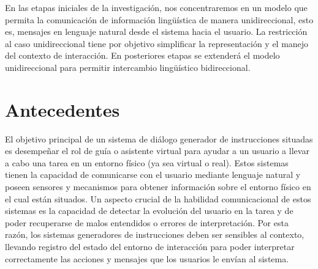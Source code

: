 \documentclass[10.9pt,a4paper]{article}
\begin{document}
En las etapas iniciales de la investigaci\'on, nos concentraremos en un 
modelo que permita la comunicaci\'on de informaci\'on ling\"u\'istica de 
manera unidireccional, esto es, mensajes en lenguaje natural desde el 
sistema hacia el usuario. La restricci\'on al caso unidireccional tiene por 
objetivo simplificar la representaci\'on y el manejo del contexto de
interacci\'on. En posteriores etapas se extender\'a el modelo unidireccional 
para permitir intercambio ling\"u\'istico bidireccional.




\section{Antecedentes}

El objetivo principal de un sistema de di\'alogo generador de instrucciones 
situadas es desempe\~nar el rol de gu\'ia o asistente virtual para ayudar a 
un usuario a llevar a cabo una tarea en un entorno f\'isico (ya sea virtual o 
real). Estos sistemas tienen la capacidad de comunicarse con el 
usuario mediante lenguaje natural y poseen sensores y mecanismos para 
obtener informaci\'on sobre el entorno f\'isico en el cual est\'an situados. 
Un aspecto crucial de la habilidad comunicacional de estos sistemas es la 
capacidad de detectar la evoluci\'on del usuario en la tarea y de poder 
recuperarse de malos entendidos o errores de interpretaci\'on.
Por esta raz\'on, los sistemas generadores de instrucciones deben ser 
sensibles al contexto, llevando registro del estado del entorno de 
interacci\'on para poder interpretar correctamente las acciones y mensajes 
que los usuarios le env\'ian al sistema.
\end{document}
